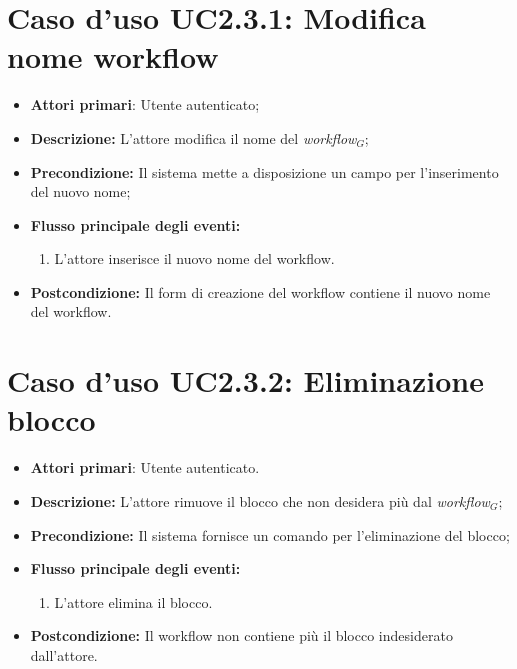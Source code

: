 		\section{Caso d'uso UC2.3.1: Modifica nome workflow}
		\begin{itemize}
			\item \textbf{Attori primari}: Utente autenticato;
			\item \textbf{Descrizione:} L'attore modifica il nome del \textit{workflow$_{G}$};
			\item \textbf{Precondizione:} Il sistema mette a disposizione un campo per l'inserimento del nuovo nome;
			\item \textbf{Flusso principale degli eventi:}
			\begin{enumerate}
				\item L'attore inserisce il nuovo nome del workflow.
			\end{enumerate}
			\item \textbf{Postcondizione:} Il form di creazione del workflow contiene il nuovo nome del workflow.
		\end{itemize}
		\section{Caso d'uso UC2.3.2: Eliminazione blocco }
		\begin{itemize}
			\item \textbf{Attori primari}: Utente autenticato.
			\item \textbf{Descrizione:} L'attore rimuove il blocco che non desidera più dal \textit{workflow$_{G}$};
			\item \textbf{Precondizione:} Il sistema fornisce un comando per l'eliminazione del blocco;
			\item \textbf{Flusso principale degli eventi:}
			\begin{enumerate}
				\item L'attore elimina il blocco.
			\end{enumerate}
			\item \textbf{Postcondizione:} Il workflow non contiene più il blocco indesiderato dall'attore.
		\end{itemize}
